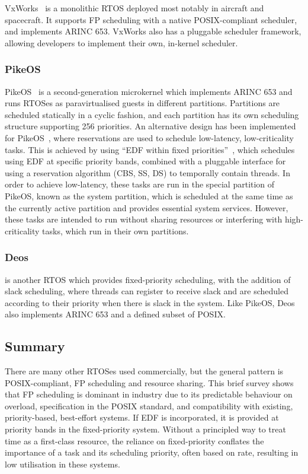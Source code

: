 VxWorks~\citep{VxWorks_08} is a monolithic \gls{RTOS} deployed most notably in aircraft
and spacecraft.  It supports \gls{FP} scheduling with a native POSIX-compliant scheduler, and
implements ARINC 653.  VxWorks
also has a pluggable scheduler framework, allowing developers to implement their own, in-kernel
scheduler.

\subsubsection{PikeOS}

PikeOS~\citep{PikeOS:URL} is a second-generation microkernel which implements ARINC 653 
and runs RTOSes as paravirtualised guests in different partitions. Partitions are scheduled
statically in a cyclic fashion, and each partition has its own scheduling structure supporting 256
priorities.
An alternative design has been implemented for PikeOS~\citep{Vanga_BTB_17}, where reservations are
used to schedule low-latency, low-criticality tasks.
This is achieved by using ``\gls{EDF} within fixed priorities''~\citep{Harbour_Palencia_03}, which
schedules using EDF at specific priority bands, combined with a pluggable interface for using a
reservation algorithm (\eg \gls{CBS}, \gls{SS}, \gls{DS}) to temporally contain threads. In order to achieve low-latency, these tasks are run
in the special partition of PikeOS, known as the system partition, which is scheduled at the same
time as the currently active partition and provides essential system services. However, these tasks
are intended to run without sharing resources or interfering with high-criticality tasks, which run
in their own partitions.

\subsubsection{Deos}

\citet{Deos:URL} is another RTOS which provides fixed-priority scheduling, with the addition of slack
scheduling, where threads can register to receive slack and are scheduled according to their
priority when there is slack in the system. Like PikeOS, Deos also implements ARINC 653 and a
defined subset of POSIX.

\subsection{Summary}

There are many other \gls{RTOS}es used commercially, but the general pattern is POSIX-compliant, 
\gls{FP} scheduling and resource sharing.
This brief survey shows that \gls{FP} scheduling is dominant in industry due to its predictable
behaviour on overload, specification in the
POSIX standard, and compatibility with existing, priority-based, best-effort systems. 
If \gls{EDF} is incorporated, it is provided at priority bands in the fixed-priority system.
Without a principled way to treat time as a first-class resource, the reliance on fixed-priority
conflates the importance of a task and its scheduling priority, often based on rate, resulting in 
low utilisation in these systems.

